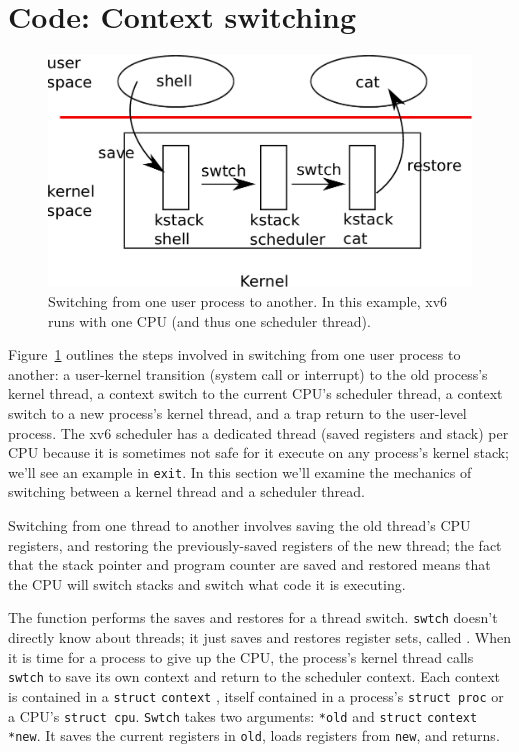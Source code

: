\section{Code: Context switching}

\begin{figure}[t]
\center
\includegraphics[scale=0.5]{fig/switch.pdf}
\caption{Switching from one user process to another.  In this example, xv6 runs with one CPU (and thus one scheduler thread).}
\label{fig:switch}
\end{figure}

Figure~\ref{fig:switch} 
outlines the steps involved in switching from one
user process to another:
a user-kernel transition (system
call or interrupt) to the old process's kernel thread,
a context switch to the current CPU's scheduler thread, a context
switch to a new process's kernel thread, and a trap return
to the user-level process.
The xv6 scheduler has a dedicated thread (saved registers and stack)
per CPU because
it is sometimes not safe for it execute on
any process's kernel stack;
we'll see an example in
\lstinline{exit}. 
In this section we'll examine the mechanics of switching
between a kernel thread and a scheduler thread.

Switching from one thread to another involves saving the old thread's
CPU registers, and restoring the previously-saved registers of the
new thread; the fact that
the stack pointer and program counter
are saved and restored means that the CPU will switch stacks and
switch what code it is executing.

The function
performs the saves and restores for a thread switch.
\lstinline{swtch}
doesn't directly know about threads; it just saves and
restores register sets, called 
.
When it is time for a process to give up the CPU,
the process's kernel thread calls
\lstinline{swtch}
to save its own context and return to the scheduler context.
Each context is contained in a
\lstinline{struct}
\lstinline{context}
,
itself contained in a process's
\lstinline{struct proc}
or a CPU's
\lstinline{struct cpu}.
\lstinline{Swtch}
takes two arguments:
\lstinline{*old}
and
\lstinline{struct}
\lstinline{context}
\lstinline{*new}.
It saves the current registers in
\lstinline{old},
loads registers from 
\lstinline{new},
and returns.

